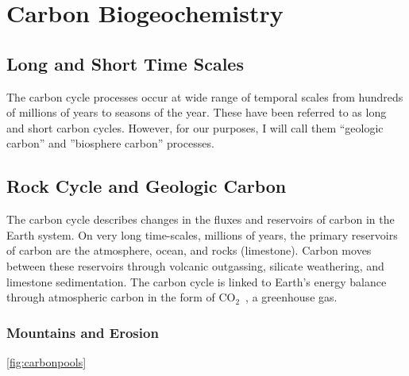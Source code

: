 \documentclass{book}\usepackage{knitr}
\newcommand{\carbondioxide}{CO$_2$~}
\begin{document}
\section{Carbon Biogeochemistry}

\subsection{Long and Short Time Scales}

The carbon cycle processes occur at wide range of temporal scales from hundreds of millions of years to seasons of the year. These have been referred to as long and short carbon cycles. However, for our purposes, I will call them ``geologic carbon'' and ''biosphere carbon'' processes. 

\subsection{Rock Cycle and Geologic Carbon}

The carbon cycle describes changes in the fluxes and reservoirs of carbon in the Earth system. On very long time-scales, millions of years, the primary reservoirs of carbon are the atmosphere, ocean, and rocks (limestone). Carbon moves between these reservoirs through volcanic outgassing, silicate weathering, and limestone sedimentation. The carbon cycle is linked to Earth's energy balance through atmospheric carbon in the form of \carbondioxide, a greenhouse gas.

\subsubsection{Mountains and Erosion}

\ref{fig:carbonpools}
\end{document}
